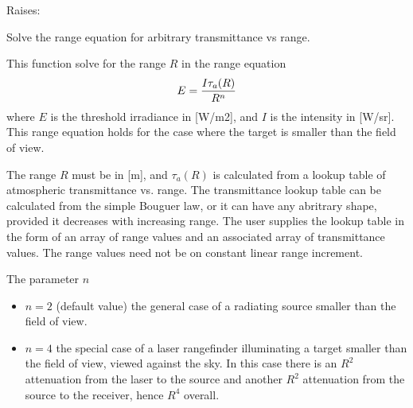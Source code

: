 \documentclass[a4paper,10pt,english]{sphinxmanual}
\begin{document}
\begin{fulllineitems}
\begin{description}
\item[{Raises:}] \leavevmode
{}

\end{description}

\end{fulllineitems}


\begin{fulllineitems}
\label{ryutils:pyradi.ryutils.rangeEquation}
Solve the range equation for arbitrary transmittance vs range.

This function solve for the range \(R\) in the range equation
\begin{gather}
\begin{split}E = \frac{I\tau_a(R)}{R^n}\end{split}\notag
\end{gather}
where \(E\) is the threshold irradiance in {[}W/m2{]},
and \(I\) is the intensity in {[}W/sr{]}. This range equation holds for
the case where the target is smaller than the field of view.

The range \(R\) must be in {[}m{]}, and \(\tau_a(R)\)
is calculated from a lookup table of atmospheric transmittance vs. range.
The transmittance lookup table  can be calculated from the simple Bouguer law,
or it can have any abritrary shape, provided it decreases with increasing range.
The user supplies the lookup table in the form of an array of range values and
an associated array of transmittance values.  The range values need not be on
constant linear range increment.

The parameter \(n\)
\begin{itemize}
\item {} 
\(n=2\) (default value) the general case of a radiating source
smaller than the field of view.

\item {} 
\(n=4\) the special case of a laser rangefinder illuminating a target
smaller than the field of view, viewed against the sky. In this case there
is an \(R^2\) attenuation from the laser to the source and another
\(R^2\) attenuation from the source to the receiver, hence
\(R^4\) overall.


\end{itemize}
\end{fulllineitems}
\end{document}
